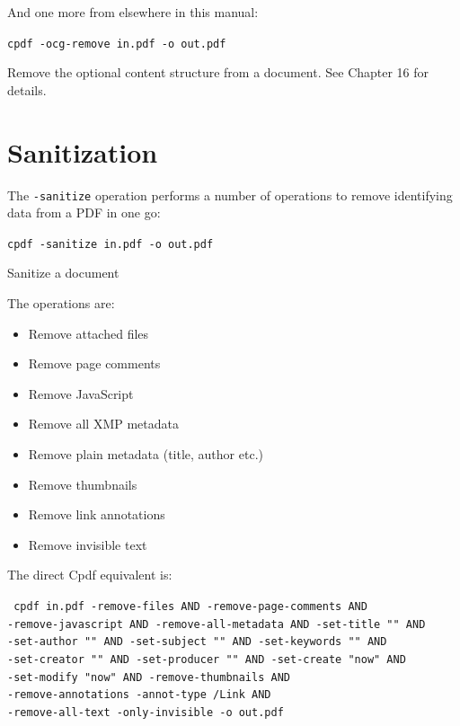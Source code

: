 \documentclass{book}
\begin{document}
\noindent And one more from elsewhere in this manual:

  \begin{framed}
    \noindent\small\verb!cpdf -ocg-remove in.pdf -o out.pdf!
 
    \vspace{2.5mm}
    \noindent Remove the optional content structure from a document. See Chapter 16 for details.
  \end{framed}

\section{Sanitization}

The \texttt{-sanitize} operation performs a number of operations to remove identifying data from a PDF in one go:

  \begin{framed}
    \noindent\small\verb!cpdf -sanitize in.pdf -o out.pdf!
 
    \vspace{2.5mm}
    \noindent Sanitize a document
  \end{framed}

\noindent The operations are:

\begin{itemize}
\item Remove attached files
\item Remove page comments
\item Remove JavaScript
\item Remove all XMP metadata
\item Remove plain metadata (title, author etc.)
\item Remove thumbnails
\item Remove link annotations
\item Remove invisible text
\end{itemize}

\noindent The direct Cpdf equivalent is:

\medskip

\noindent\texttt{
cpdf in.pdf -remove-files AND -remove-page-comments AND\\
  -remove-javascript AND -remove-all-metadata AND -set-title "" AND\\
  -set-author "" AND -set-subject "" AND -set-keywords "" AND\\
  -set-creator "" AND -set-producer "" AND -set-create "now" AND\\
  -set-modify "now" AND -remove-thumbnails AND\\
  -remove-annotations -annot-type /Link AND\\
  -remove-all-text -only-invisible -o out.pdf}
\end{document}
